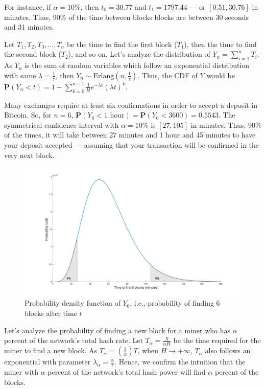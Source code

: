 For instance, if $\alpha = 10\%$, then $t_0 = 30.77$ and $t_1 = 1797.44$ --- or $[0.51, 30.76]$ in minutes. Thus, 90\% of the time between blocks blocks are between 30 seconds and 31 minutes.

Let $T_1, T_2, T_3, \dots, T_n$ be the time to find the first block ($T_1$), then the time to find the second block ($T_2$), and so on. Let's analyze the distribution of $Y_n = \sum_{i=1}^{n} T_i$. As $Y_n$ is the sum of random variables which follow an exponential distribution with same $\lambda = \frac{1}{\tau}$, then $Y_n \sim \text{Erlang}(n, \frac{1}{\tau})$. Thus, the CDF of $Y$ would be $\mathbf{P}(Y_n < t) = 1 - \sum_{k=0}^{n-1} \frac{1}{k!} e^{-\lambda t} (\lambda t)^k$.

Many exchanges require at least six confirmations in order to accept a deposit in Bitcoin. So, for $n=6$, $\mathbf{P}(Y_6 < 1 \text{ hour}) = \mathbf{P}(Y_6 < 3600) = 0.5543$. The symmetrical confidence interval with $\alpha=10\%$ is $[27, 105]$ in minutes. Thus, 90\% of the times, it will take between 27 minutes and 1 hour and 45 minutes to have your deposit accepted --- assuming that your transaction will be confirmed in the very next block.

\begin{figure}[ht]
\centering\includegraphics[width=\textwidth]{./images01/time-6-blocks.svg}
\caption{Probability density function of $Y_6$, i.e., probability of finding 6 blocks after time $t$\label{fig-bitcoin-time-6-blocks}}
\end{figure}

Let's analyze the probability of finding a new block for a miner who has $\alpha$ percent of the network's total hash rate. Let $T_\alpha = \frac{X}{\alpha H}$ be the time required for the miner to find a new block. As $T_\alpha = \left( \frac{1}{\alpha} \right) T$, when $H \rightarrow +\infty$, $T_\alpha$ also follows an exponential with parameter $\lambda_\alpha = \frac{\alpha}{\tau}$. Hence, we confirm the intuition that the miner with $\alpha$ percent of the network's total hash power will find $\alpha$ percent of the blocks.

